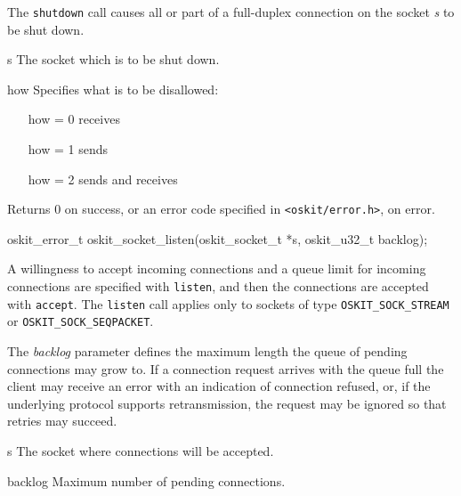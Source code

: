 \begin{apidesc}
	The \texttt{shutdown} call causes all or part of a full-duplex 
	connection on the socket \emph{s} to be shut down.  
\end{apidesc}

\begin{apiparm}
        \item[s]
                The socket which is to be shut down.

        \item[how]
                Specifies what is to be disallowed:
		\begin{itemize}
		\item[how = 0]	receives
		\item[how = 1]	sends
		\item[how = 2]	sends and receives
		\end{itemize}

\end{apiparm}

\begin{apiret}
        Returns 0 on success, or an error code specified in
        {\tt <oskit/error.h>}, on error.
\end{apiret}

%
%

\begin{apisyn}

        \funcproto oskit_error_t
        oskit_socket_listen(oskit_socket_t *s,
		 oskit_u32_t backlog);
\end{apisyn}

\begin{apidesc}
	A willingness to accept incoming connections and a queue limit 
	for incoming connections are specified with \texttt{listen},
	and then the connections are accepted with \texttt{accept}.
	The \texttt{listen} call applies only to sockets of type
	\texttt{OSKIT_SOCK_STREAM} or  \texttt{OSKIT_SOCK_SEQPACKET}.

	The \emph{backlog} parameter defines the maximum length the queue of
	pending connections may grow to. 
	If a connection request arrives with the queue full the client may 
	receive an error with an indication of connection refused, or, if
	the underlying protocol supports retransmission, the request may
	be ignored so that retries may succeed.
\end{apidesc}

\begin{apiparm}
        \item[s]
                The socket where connections will be accepted.

        \item[backlog]
		Maximum number of pending connections.

\end{apiparm}

